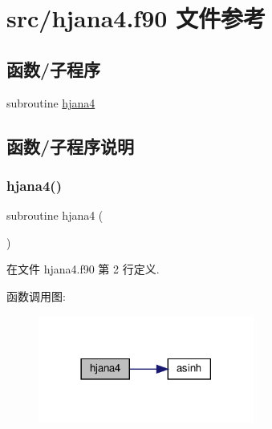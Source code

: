 \hypertarget{hjana4_8f90}{}\section{src/hjana4.f90 文件参考}
\label{hjana4_8f90}
\subsection*{函数/子程序}
\begin{DoxyCompactItemize}
\item 
subroutine \mbox{\hyperlink{hjana4_8f90_a1888c234b47af093e84064500b248ac2}{hjana4}}
\end{DoxyCompactItemize}


\subsection{函数/子程序说明}
\mbox{\label{hjana4_8f90_a1888c234b47af093e84064500b248ac2}} 
\subsubsection{\texorpdfstring{hjana4()}{hjana4()}}
{\footnotesize\ttfamily subroutine hjana4 (\begin{DoxyParamCaption}{ }\end{DoxyParamCaption})}



在文件 hjana4.\+f90 第 2 行定义.

函数调用图\+:
\nopagebreak
\begin{figure}[H]
\begin{center}
\leavevmode
\includegraphics[width=201pt]{hjana4_8f90_a1888c234b47af093e84064500b248ac2_cgraph}
\end{center}
\end{figure}
